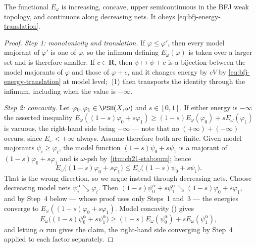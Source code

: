 \begin{theorem}\label{thm:extended-energy-basic}
The functional \(E_\omega\) is increasing, concave, upper semicontinuous in
the BFJ weak topology, and continuous along decreasing nets. It obeys
\eqref{eq:bfj-energy-translation}.
\end{theorem}

\begin{proof}
\emph{Step 1: monotonicity and translation.}  If \(\varphi\leq\varphi'\), then
every model majorant of \(\varphi'\) is one of \(\varphi\), so the infimum
defining \(E_\omega(\varphi)\) is taken over a larger set and is therefore
smaller.  If \(c\in\mathbf R\), then \(\psi\mapsto\psi+c\) is a bijection
between the model majorants of \(\varphi\) and those of \(\varphi+c\), and it
changes energy by \(cV\) by \eqref{eq:bfj-energy-translation} at model level;
\,(1) then transports the identity through the
infimum, including when the value is \(-\infty\).

\emph{Step 2: concavity.}  Let \(\varphi_0,\varphi_1\in\PSH(X,\omega)\) and
\(s\in[0,1]\).  If either energy is \(-\infty\) the asserted inequality
\(E_\omega((1-s)\varphi_0+s\varphi_1)\geq(1-s)E_\omega(\varphi_0)+sE_\omega(\varphi_1)\)
is vacuous, the right-hand side being \(-\infty\) --- note that no
\((+\infty)+(-\infty)\) occurs, since \(E_\omega<+\infty\) always.  Assume
therefore both are finite.  Given model majorants \(\psi_i\geq\varphi_i\),
the model function \((1-s)\psi_0+s\psi_1\) is a majorant of
\((1-s)\varphi_0+s\varphi_1\) and is \(\omega\)-psh by
\,\cref{itm:ch21-stab:sum}; hence
\[
 E_\omega\bigl((1-s)\varphi_0+s\varphi_1\bigr)
 \leq E_\omega\bigl((1-s)\psi_0+s\psi_1\bigr).
\]
That is the wrong direction, so we argue instead through decreasing nets.
Choose decreasing model nets \(\psi_i^\alpha\searrow\varphi_i\).  Then
\((1-s)\psi_0^\alpha+s\psi_1^\alpha\searrow(1-s)\varphi_0+s\varphi_1\), and
by Step~4 below --- whose proof uses only Steps~1 and~3 --- the energies
converge to \(E_\omega((1-s)\varphi_0+s\varphi_1)\).  Model concavity
() gives
\[
 E_\omega\bigl((1-s)\psi_0^\alpha+s\psi_1^\alpha\bigr)
 \geq(1-s)E_\omega(\psi_0^\alpha)+sE_\omega(\psi_1^\alpha),
\]
and letting \(\alpha\) run gives the claim, the right-hand side converging by
Step~4 applied to each factor separately.


\end{proof}
